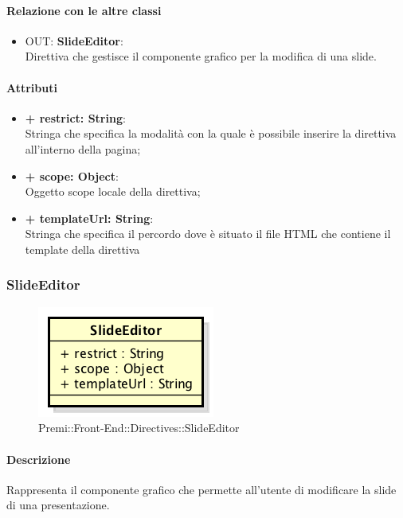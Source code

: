 	\paragraph{Relazione con le altre classi}
	\begin{itemize}
		\item OUT: \textbf{SlideEditor}:\\
		Direttiva che gestisce il componente grafico per la modifica di una slide.
	\end{itemize}
	
	\paragraph{Attributi}
	\begin{itemize}
		\item \textbf{+ restrict: String}:\\
		Stringa che specifica la modalità con la quale è possibile inserire la direttiva all'interno della pagina;
		\item \textbf{+ scope: Object}:\\
		Oggetto scope locale della direttiva;
		\item \textbf{+ templateUrl: String}:\\
		Stringa che specifica il percordo dove è situato il file HTML che contiene il template della direttiva
	\end{itemize}
\newpage


\subsubsection{SlideEditor}
	\begin{figure}[h]
		\centering
		\includegraphics[width=0.5\linewidth]{img/premi_front_end_directives_slideeditor}
		\caption[Premi::Front-End::Directives::SlideEditor]{Premi::Front-End::Directives::SlideEditor}
	\end{figure}
	
	\paragraph{Descrizione}
	Rappresenta il componente grafico che permette all'utente di modificare la slide di una presentazione.
	
